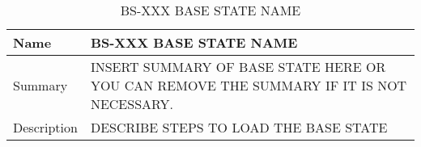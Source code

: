 \begin{table}[htbp!]
\centering
      \begin{tabular}{|p{1.05 in} |p{4.75 in} |}
      \hline
         \rowcolor[rgb]{0.8,0.8,0.8} Name & BS-XXX BASE STATE NAME\\
         \hline
         Summary &
         INSERT SUMMARY OF BASE STATE HERE OR YOU CAN REMOVE THE SUMMARY IF IT IS NOT NECESSARY.
         \\ \hline
         Description &
         DESCRIBE STEPS TO LOAD THE BASE STATE
         \\ \hline
\end{tabular}
      \label{Table: BS-XXX}
      \caption{BS-XXX BASE STATE NAME}
\end{table}